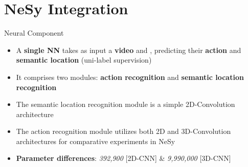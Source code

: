\documentclass[10pt, aspectratio=169]{beamer}
\begin{document}
\section{NeSy Integration}
{
    \begin{frame}
        \sectionpage%
    \end{frame}
}


\begin{frame}{Neural Component}
    \begin{itemize}
        \setlength{\itemsep}{13pt}
        \item A \textbf{single NN} takes as input a \textbf{video} and  , predicting their \textbf{action} and \textbf{semantic location} (uni-label supervision)
        \item It comprises two modules: \textbf{action recognition} and \textbf{semantic location recognition}
        \item The semantic location recognition module is a simple \textcolor{umBlueLighter}{2D-Convolution} architecture
        \item The action recognition module utilizes both \textcolor{umBlueLighter}{2D} and \textcolor{umBlueLighter}{3D-Convolution} architectures for comparative experiments in NeSy
        \item \textbf{Parameter differences}: \textit{392,900} [2D-CNN] \& \textit{9,990,000} [3D-CNN]
     \end{itemize}
\end{frame}
\end{document}

